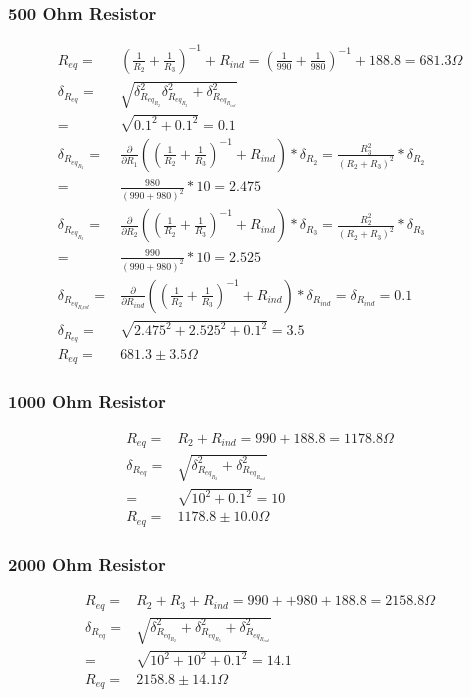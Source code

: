 \documentclass[12pt]{article}
\newcommand{\paren}[1]{\left( {#1} \right)}
\begin{document}
\subsubsection{500 Ohm Resistor} \label{subsub:500R}
\begin{align}
R_{eq}=&\paren{\frac{1}{R_2}+\frac{1}{R_3}}^{-1} + R_{ind}=\paren{\frac{1}{990}+\frac{1}{980}}^{-1}+188.8=681.3\Omega \nonumber \\
\delta_{R_{eq}}=&\sqrt{\delta_{R_{{eq}_{R_2}}}^2\delta_{R_{{eq}_{R_3}}}^2+\delta_{R_{{eq}_{R_{ind}}}}^2} \nonumber \\
=&\sqrt{0.1^2+0.1^2}=0.1 \nonumber \\
\delta_{R_{{eq}_{R_2}}}=&\frac{\partial}{\partial R_1}\paren{\paren{\frac{1}{R_2}+\frac{1}{R_3}}^{-1} + R_{ind}}*\delta_{R_2} = \frac{R_3^2}{\paren{R_2+R_3}^2} * \delta_{R_2} \nonumber \\
=& \frac{980}{(990+980)^2}*10=2.475 \nonumber \\
\delta_{R_{{eq}_{R_3}}}=&\frac{\partial}{\partial R_2}\paren{\paren{\frac{1}{R_2}+\frac{1}{R_3}}^{-1} + R_{ind}}*\delta_{R_3} = \frac{R_2^2}{\paren{R_2+R_3}^2} * \delta_{R_3} \nonumber \\
=& \frac{990}{(990+980)^2}*10=2.525\nonumber \\
\delta_{R_{{eq}_{R_ind}}}=&\frac{\partial}{\partial R_{ind}}\paren{\paren{\frac{1}{R_2}+\frac{1}{R_3}}^{-1} + R_{ind}}*\delta_{R_{ind}} = \delta_{R_{ind}} = 0.1 \nonumber \\
\delta_{R_{eq}}=&\sqrt{2.475^2+2.525^2+0.1^2}=3.5 \nonumber \\
R_{eq}=&681.3\pm3.5\Omega \label{eq:500R_w_Inductor}
\end{align}

\subsubsection{1000 Ohm Resistor} \label{subsub:1000R_nofunc}
\begin{align}
R_{eq}=&R_2 + R_{ind}=990+188.8=1178.8\Omega \nonumber \\
\delta_{R_{eq}}=&\sqrt{\delta_{R_{{eq}_{R_2}}}^2+\delta_{R_{{eq}_{R_{ind}}}}^2} \nonumber \\
=&\sqrt{10^2+0.1^2}=10 \nonumber \\
R_{eq}=&1178.8\pm10.0\Omega \label{eq:1000R_w_Inductor}
\end{align}

\subsubsection{2000 Ohm Resistor} \label{subsub:2000R}
\begin{align}
R_{eq}=&R_2 + R_3 + R_{ind}=990++980+188.8=2158.8\Omega \nonumber \\
\delta_{R_{eq}}=&\sqrt{\delta_{R_{{eq}_{R_2}}}^2+\delta_{R_{{eq}_{R_3}}}^2+\delta_{R_{{eq}_{R_{ind}}}}^2} \nonumber \\
=&\sqrt{10^2+10^2+0.1^2}=14.1 \nonumber \\
R_{eq}=&2158.8\pm14.1\Omega \label{eq:2000R_w_Inductor}
\end{align}
\end{document}
